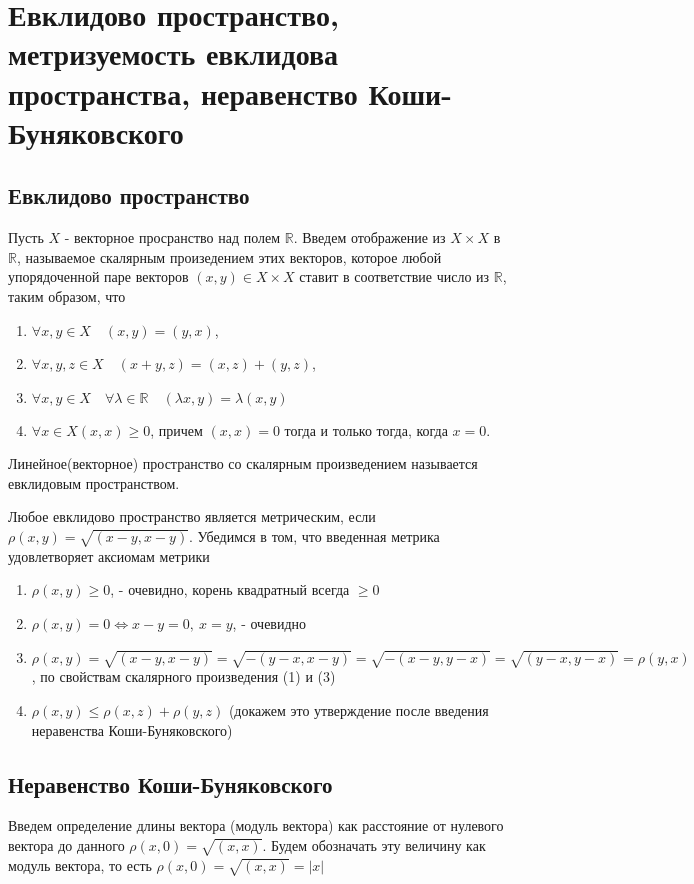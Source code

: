 \section{Евклидово пространство, метризуемость евклидова пространства, неравенство Коши-Буняковского}
\subsection{Евклидово пространство}

Пусть $X$ - векторное просранство над полем $\mathbb {R}$. Введем отображение из $X \times X$ в $\mathbb {R}$, называемое скалярным произедением этих векторов, которое любой упорядоченной паре векторов $(x, y) \in X \times X$ ставит в соответствие число из $\mathbb {R}$, таким образом, что


\begin{enumerate} 
  \item $\forall x,y \in X \quad (x, y) = (y, x)$,
  \item  $\forall x,y,z \in X \quad (x + y, z) = (x, z) + (y, z)$,
  \item $\forall x,y \in X \quad \forall \lambda \in \mathbb {R} \quad (\lambda x, y) = \lambda(x, y)$
  \item $\forall x \in X (x, x) \geq 0$, причем $(x, x) = 0$ тогда и только тогда, когда $x = 0$.
\end{enumerate}
Линейное(векторное) пространство со скалярным произведением называется евклидовым пространством.

Любое евклидово пространство является метрическим, если $\rho(x, y) = \sqrt{(x - y, x - y)}$. Убедимся в том, что введенная метрика удовлетворяет аксиомам метрики
\begin{enumerate} 
  \item $\rho(x, y) \geq 0$, - очевидно, корень квадратный всегда $\geq 0$ 
  \item  $\rho(x, y) = 0 \Leftrightarrow x-y = 0, \ x=y$, - очевидно
  \item $\rho(x, y) = \sqrt{(x - y, x - y)} = \sqrt{-(y-x, x - y)} = \sqrt{-(x -y, y - x)} = \sqrt{(y - x, y - x)}=\rho(y, x)$, по свойствам скалярного произведения (1) и (3) 
  \item $\rho(x, y) \leq \rho(x, z) + \rho(y, z)$ (докажем это утверждение после введения неравенства Коши-Буняковского)
\end{enumerate}
\subsection{Неравенство Коши-Буняковского}
Введем определение длины вектора (модуль вектора) как расстояние от нулевого вектора до данного $\rho(x, 0) = \sqrt{(x, x)}$. Будем обозначать эту величину как модуль вектора, то есть $\rho(x, 0) = \sqrt{(x, x)} = |x|$

